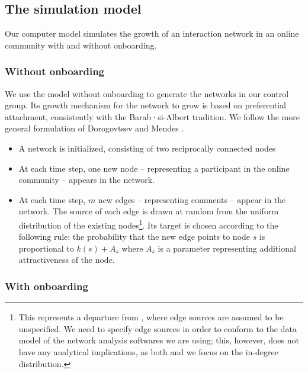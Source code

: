 \documentclass{nws}
\begin{document}
\subsection{The simulation model}

Our computer model simulates the growth of an interaction network in an online community with and without onboarding.  

\subsubsection*{Without onboarding}

We use the model without onboarding to generate the networks in our control group. Its growth mechanism for the network to grow is based on preferential attachment, consistently with the Barab·si-Albert tradition. We follow the more general formulation of Dorogovtsev and Mendes \cite{dorogovtsev2002evolution}.
\begin{itemize}
\item A network is initialized, consisting of two reciprocally connected nodes
\item At each time step, one new node -- representing a participant in the online community -- appears in the network. 
\item At each time step, $m$ new edges --  representing comments --  appear in the network. The source of each edge is drawn at random from the uniform distribution of the existing nodes\footnote{This represents a departure from \cite{dorogovtsev2002evolution}, where edge sources are assumed to be unspecified. We need to specify edge sources in order to conform to the data model of the network analysis softwares we are using; this, however, does not have any analytical implications, as both \cite{dorogovtsev2002evolution} and we focus on the in-degree distribution.}. Its target is chosen according to the following rule: the probability that the new edge points to node $s$ is proportional to $k(s) + A_s$ where $A_s$ is a parameter representing additional attractiveness of the node.
\end{itemize}

\subsubsection*{With onboarding}
\end{document}
